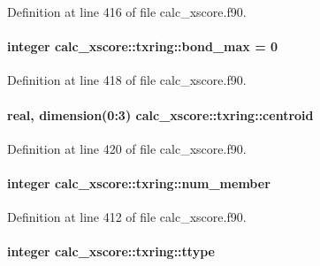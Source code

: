 Definition at line 416 of file calc\-\_\-xscore.\-f90.

\hypertarget{structcalc__xscore_1_1txring_a3d97d2a271705d15ed99852f1207b4cd}{
\paragraph[{bond\-\_\-max}]{\setlength{\rightskip}{0pt plus 5cm}integer calc\-\_\-xscore\-::txring\-::bond\-\_\-max = 0}}\label{structcalc__xscore_1_1txring_a3d97d2a271705d15ed99852f1207b4cd}


Definition at line 418 of file calc\-\_\-xscore.\-f90.

\hypertarget{structcalc__xscore_1_1txring_a9fe147d85980c98b2739dbd3530a7df8}{
\paragraph[{centroid}]{\setlength{\rightskip}{0pt plus 5cm}real, dimension(0\-:3) calc\-\_\-xscore\-::txring\-::centroid}}\label{structcalc__xscore_1_1txring_a9fe147d85980c98b2739dbd3530a7df8}


Definition at line 420 of file calc\-\_\-xscore.\-f90.

\hypertarget{structcalc__xscore_1_1txring_ad4f6fb0318b14ad9a6022d8e83a968fe}{
\paragraph[{num\-\_\-member}]{\setlength{\rightskip}{0pt plus 5cm}integer calc\-\_\-xscore\-::txring\-::num\-\_\-member}}\label{structcalc__xscore_1_1txring_ad4f6fb0318b14ad9a6022d8e83a968fe}


Definition at line 412 of file calc\-\_\-xscore.\-f90.

\hypertarget{structcalc__xscore_1_1txring_a97bbaae70912399e1cd84b75afd2304e}{
\paragraph[{ttype}]{\setlength{\rightskip}{0pt plus 5cm}integer calc\-\_\-xscore\-::txring\-::ttype}}\label{structcalc__xscore_1_1txring_a97bbaae70912399e1cd84b75afd2304e}


